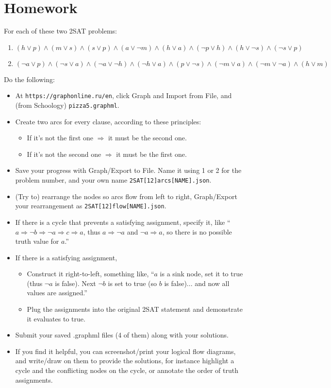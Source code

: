 \documentclass[12pt]{article}
\begin{document}
\clearpage
\section*{Homework}
For each of these two 2SAT problems:
\begin{enumerate}
\item
$(h \lor p) \land (m \lor s) \land (s \lor p) \land (a \lor \neg m)
  \land (h \lor a) \land (\neg p \lor h) \land (h \lor \neg s) \land
  (\neg s \lor p)$
\item
$(\neg a \lor p) \land (\neg s \lor a) \land (\neg a \lor \neg h) \land
  (\neg h \lor a) \land (p \lor \neg s) \land (\neg m \lor a) \land (\neg
  m \lor \neg a) \land (h \lor m)$
\end{enumerate}

Do the following:
\begin{itemize}
\item At {\tt https://graphonline.ru/en}, click Graph and Import from File, and (from
  Schoology) {\tt pizza5.graphml}.
\item Create two arcs for every clause, according to these principles:
  \begin{itemize}
  \item If it's not the first one $\Rightarrow$ it must be the second one.
  \item If it's not the second one $\Rightarrow$ it must be the first one.
  \end{itemize}
\item Save your progress with Graph/Export to File. Name it using 1 or 2 for
  the problem number, and your own name {\tt 2SAT[12]arcs[NAME].json}.
\item (Try to) rearrange the nodes so arcs flow from left to right, Graph/Export
  your rearrangement as {\tt 2SAT[12]flow[NAME].json}.
\item If there is a cycle that prevents a satisfying assignment, specify it,
  like ``$a \Rightarrow \neg b \Rightarrow \neg a \Rightarrow c \Rightarrow a$,
  thus $a\Rightarrow\neg a$ and $\neg a\Rightarrow a$, so there is no possible
  truth value for $a$.''
\item If there is a satisfying assignment,
  \begin{itemize}
    \item Construct it right-to-left, something like, ``$a$ is a sink node, set
      it to {\sc true} (thus $\neg a$ is {\sc false}). Next $\neg b$ is set to
      {\sc true} (so $b$ is {\sc false})... and now all values are assigned.''
    \item Plug the assignments into the original 2SAT statement and demonstrate
      it evaluates to {\sc true}.
  \end{itemize}

\item Submit your saved .graphml files (4 of them) along with your solutions.
\item If you find it helpful, you can screenshot/print your logical flow
  diagrams, and write/draw on them to provide the solutions, for instance
  highlight a cycle and the conflicting nodes on the cycle, or annotate the
  order of truth assignments.
\end{itemize}
\end{document}
